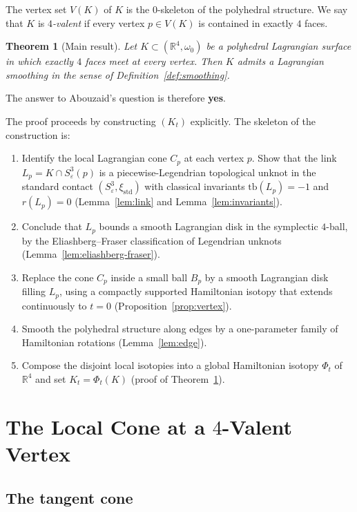 \documentclass[12pt]{article}
\newtheorem{theorem}{Theorem}
\theoremstyle{definition}
\begin{document}
The vertex set $V(K)$ of $K$ is the $0$-skeleton of the polyhedral structure. We say that $K$ is \emph{$4$-valent} if every vertex $p\in V(K)$ is contained in exactly $4$ faces.

\begin{theorem}[Main result]\label{thm:main}
Let $K\subset(\mathbb{R}^4,\omega_0)$ be a polyhedral Lagrangian surface in which exactly $4$ faces meet at every vertex. Then $K$ admits a Lagrangian smoothing in the sense of Definition~\ref{def:smoothing}.
\end{theorem}

The answer to Abouzaid's question is therefore \textbf{yes}.

\medskip

The proof proceeds by constructing $(K_t)$ explicitly. The skeleton of the construction is:
\begin{enumerate}
\item Identify the local Lagrangian cone $C_p$ at each vertex $p$. Show that the link $L_p = K\cap S^3_\varepsilon(p)$ is a piecewise-Legendrian topological unknot in the standard contact $(S^3_\varepsilon,\xi_{\mathrm{std}})$ with classical invariants $\mathrm{tb}(L_p)=-1$ and $r(L_p)=0$ (Lemma~\ref{lem:link} and Lemma~\ref{lem:invariants}).
\item Conclude that $L_p$ bounds a smooth Lagrangian disk in the symplectic $4$-ball, by the Eliashberg--Fraser classification of Legendrian unknots (Lemma~\ref{lem:eliashberg-fraser}).
\item Replace the cone $C_p$ inside a small ball $B_p$ by a smooth Lagrangian disk filling $L_p$, using a compactly supported Hamiltonian isotopy that extends continuously to $t=0$ (Proposition~\ref{prop:vertex}).
\item Smooth the polyhedral structure along edges by a one-parameter family of Hamiltonian rotations (Lemma~\ref{lem:edge}).
\item Compose the disjoint local isotopies into a global Hamiltonian isotopy $\Phi_t$ of $\mathbb{R}^4$ and set $K_t=\Phi_t(K)$ (proof of Theorem~\ref{thm:main}).
\end{enumerate}

\section{The Local Cone at a $4$-Valent Vertex}

\subsection{The tangent cone}
\end{document}
